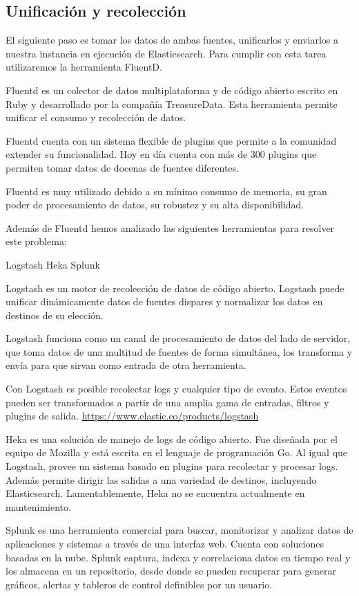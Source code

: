 \subsection{Unificación y recolección}
\label{unificacion_y_recoleccion}

El siguiente paso es tomar los datos de ambas fuentes, unificarlos y enviarlos
a nuestra instancia en ejecución de Elasticsearch. Para cumplir con esta tarea
utilizaremos la herramienta FluentD.

Fluentd es un colector de datos multiplataforma y de código abierto escrito en
Ruby y desarrollado por la compañía TreasureData. Esta herramienta permite
unificar el consumo y recolección de datos.

Fluentd cuenta con un sistema flexible de plugins que permite a la comunidad
extender su funcionalidad. Hoy en día cuenta con más de 300 plugins que
permiten tomar datos de docenas de fuentes diferentes.

Fluentd es muy utilizado debido a su mínimo consumo de memoria, su gran poder
de procesamiento de datos, su robustez y su alta disponibilidad.

Además de Fluentd hemos analizado las siguientes herramientas para resolver
este problema:

Logstash Heka Splunk

Logstash es un motor de recolección de datos de código abierto. Logstash puede
unificar dinámicamente datos de fuentes dispares y normalizar los datos en
destinos de su elección. 

Logstash funciona como un canal de procesamiento de datos del lado de servidor,
que toma datos de una multitud de fuentes de forma simultánea, los transforma y
envía para que sirvan como entrada de otra herramienta.

Con Logstash es posible recolectar logs y cualquier tipo de evento. Estos
eventos pueden ser transformados a partir de una amplia gama de entradas,
filtros y plugins de salida.  \url{https://www.elastic.co/products/logstash}

Heka es una solución de manejo de logs de código abierto. Fue diseñada por el
equipo de Mozilla y está escrita en el lenguaje de programación Go. Al igual
que Logstash, provee un sistema basado en plugins para recolectar y procesar
logs. Además permite dirigir las salidas a una variedad de destinos, incluyendo
Elasticsearch. Lamentablemente, Heka no se encuentra actualmente en
mantenimiento.

Splunk es una herramienta comercial para buscar, monitorizar y analizar datos
de aplicaciones y sistemas a través de una interfaz web. Cuenta con soluciones
basadas en la nube. Splunk captura, indexa y correlaciona datos en tiempo real
y los almacena en un repositorio, desde donde se pueden recuperar para generar
gráficos, alertas y tableros de control definibles por un usuario.

